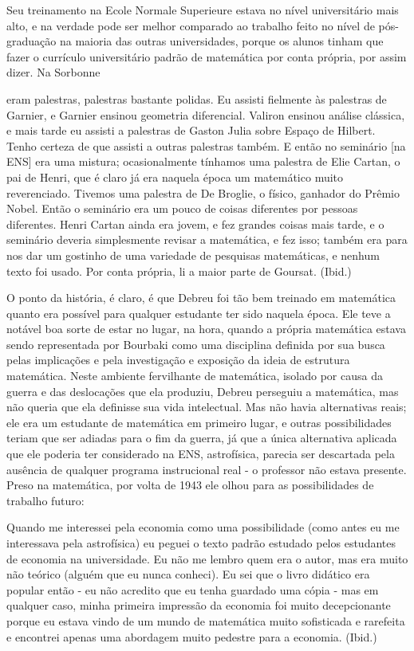 \documentclass[a4paper,12pt]{article}[abntex2]
\begin{document}
Seu treinamento na Ecole Normale Superieure estava no nível universitário mais alto, e na verdade pode ser melhor comparado ao trabalho feito no nível de pós-graduação na maioria das outras universidades, porque os alunos tinham que fazer o currículo universitário padrão de matemática por conta própria, por assim dizer. Na Sorbonne

eram palestras, palestras bastante polidas. Eu assisti fielmente às palestras de Garnier, e Garnier ensinou geometria diferencial. Valiron ensinou análise clássica, e mais tarde eu assisti a palestras de Gaston Julia sobre Espaço de Hilbert. Tenho certeza de que assisti a outras palestras também. E então no seminário [na ENS] era uma mistura; ocasionalmente tínhamos uma palestra de Elie Cartan, o pai de Henri, que é claro já era naquela época um matemático muito reverenciado. Tivemos uma palestra de De Broglie, o físico, ganhador do Prêmio Nobel. Então o seminário era um pouco de coisas diferentes por pessoas diferentes. Henri Cartan ainda era jovem, e fez grandes coisas mais tarde, e o seminário deveria simplesmente revisar a matemática, e fez isso; também era para nos dar um gostinho de uma variedade de pesquisas matemáticas, e nenhum texto foi usado. Por conta própria, li a maior parte de Goursat. (Ibid.)

O ponto da história, é claro, é que Debreu foi tão bem treinado em matemática quanto era possível para qualquer estudante ter sido naquela época. Ele teve a notável boa sorte de estar no lugar, na hora, quando a própria matemática estava sendo representada por Bourbaki como uma disciplina definida por sua busca pelas implicações e pela investigação e exposição da ideia de estrutura matemática. Neste ambiente fervilhante de matemática, isolado por causa da guerra e das deslocações que ela produziu, Debreu perseguiu a matemática, mas não queria que ela definisse sua vida intelectual. Mas não havia alternativas reais; ele era um estudante de matemática em primeiro lugar, e outras possibilidades teriam que ser adiadas para o fim da guerra, já que a única alternativa aplicada que ele poderia ter considerado na ENS, astrofísica, parecia ser descartada pela ausência de qualquer programa instrucional real - o professor não estava presente. Preso na matemática, por volta de 1943 ele olhou para as possibilidades de trabalho futuro:

Quando me interessei pela economia como uma possibilidade (como antes eu me interessava pela astrofísica) eu peguei o texto padrão estudado pelos estudantes de economia na universidade. Eu não me lembro quem era o autor, mas era muito não teórico (alguém que eu nunca conheci). Eu sei que o livro didático era popular então - eu não acredito que eu tenha guardado uma cópia - mas em qualquer caso, minha primeira impressão da economia foi muito decepcionante porque eu estava vindo de um mundo de matemática muito sofisticada e rarefeita e encontrei apenas uma abordagem muito pedestre para a economia. (Ibid.)
\end{document}

